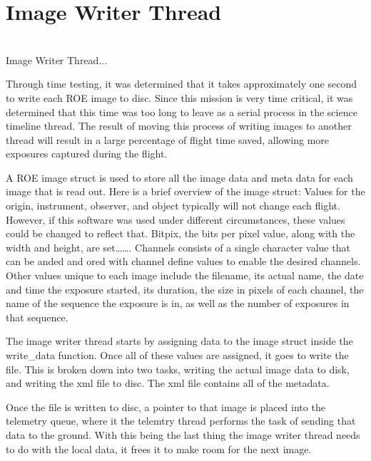 %
\section{Image Writer Thread}
\hrulefill
\\
Image Writer Thread...

Through time testing, it was determined that it takes approximately one second to write each ROE image to disc. Since this mission is very time critical, it was determined that this time was too long to leave as a serial process in the science timeline thread. The result of moving this process of writing images to another thread will result in a large percentage of flight time saved, allowing more exposures captured during the flight.

A ROE image struct is used to store all the image data and meta data for each image that is read out. Here is a brief overview of the image struct:
Values for the origin, instrument, observer, and object typically will not change each flight. However, if this software was used under different circumstances, these values could be changed to reflect that. Bitpix, the bits per pixel value, along with the width and height, are set……. Channels consists of a single character value that can be anded and ored with channel define values to enable the desired channels. Other values unique to each image include the filename, its actual name, the date and time the exposure started, its duration, the size in pixels of each channel, the name of the sequence the exposure is in, as well as the number of exposures in that sequence.  

The image writer thread starts by assigning data to the image struct inside the write\_data function. Once all of these values are assigned, it goes to write the file. This is broken down into two tasks, writing the actual image data to disk, and writing the xml file to disc. The xml file contains all of the metadata. 


Once the file is written to disc, a pointer to that image is placed into the telemetry queue, where it the telemtry thread performs the task of sending that data to the ground. With this being the last thing the image writer thread needs to do with the local data, it frees it to make room for the next image. 
